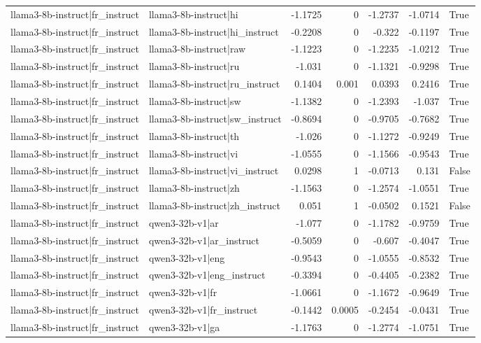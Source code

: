 \begin{table}
\begin{tabular}{l l r r r r l}
llama3-8b-instruct|fr_instruct & llama3-8b-instruct|hi & -1.1725 & 0 & -1.2737 & -1.0714 & True \\
llama3-8b-instruct|fr_instruct & llama3-8b-instruct|hi_instruct & -0.2208 & 0 & -0.322 & -0.1197 & True \\
llama3-8b-instruct|fr_instruct & llama3-8b-instruct|raw & -1.1223 & 0 & -1.2235 & -1.0212 & True \\
llama3-8b-instruct|fr_instruct & llama3-8b-instruct|ru & -1.031 & 0 & -1.1321 & -0.9298 & True \\
llama3-8b-instruct|fr_instruct & llama3-8b-instruct|ru_instruct & 0.1404 & 0.001 & 0.0393 & 0.2416 & True \\
llama3-8b-instruct|fr_instruct & llama3-8b-instruct|sw & -1.1382 & 0 & -1.2393 & -1.037 & True \\
llama3-8b-instruct|fr_instruct & llama3-8b-instruct|sw_instruct & -0.8694 & 0 & -0.9705 & -0.7682 & True \\
llama3-8b-instruct|fr_instruct & llama3-8b-instruct|th & -1.026 & 0 & -1.1272 & -0.9249 & True \\
llama3-8b-instruct|fr_instruct & llama3-8b-instruct|vi & -1.0555 & 0 & -1.1566 & -0.9543 & True \\
llama3-8b-instruct|fr_instruct & llama3-8b-instruct|vi_instruct & 0.0298 & 1 & -0.0713 & 0.131 & False \\
llama3-8b-instruct|fr_instruct & llama3-8b-instruct|zh & -1.1563 & 0 & -1.2574 & -1.0551 & True \\
llama3-8b-instruct|fr_instruct & llama3-8b-instruct|zh_instruct & 0.051 & 1 & -0.0502 & 0.1521 & False \\
llama3-8b-instruct|fr_instruct & qwen3-32b-v1|ar & -1.077 & 0 & -1.1782 & -0.9759 & True \\
llama3-8b-instruct|fr_instruct & qwen3-32b-v1|ar_instruct & -0.5059 & 0 & -0.607 & -0.4047 & True \\
llama3-8b-instruct|fr_instruct & qwen3-32b-v1|eng & -0.9543 & 0 & -1.0555 & -0.8532 & True \\
llama3-8b-instruct|fr_instruct & qwen3-32b-v1|eng_instruct & -0.3394 & 0 & -0.4405 & -0.2382 & True \\
llama3-8b-instruct|fr_instruct & qwen3-32b-v1|fr & -1.0661 & 0 & -1.1672 & -0.9649 & True \\
llama3-8b-instruct|fr_instruct & qwen3-32b-v1|fr_instruct & -0.1442 & 0.0005 & -0.2454 & -0.0431 & True \\
llama3-8b-instruct|fr_instruct & qwen3-32b-v1|ga & -1.1763 & 0 & -1.2774 & -1.0751 & True \\

\end{tabular}
\end{table}
